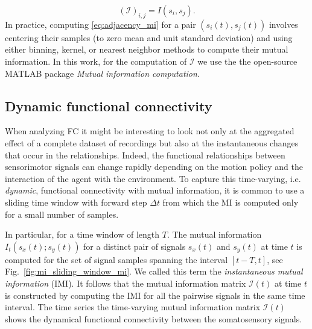 \begin{equation}\label{eq:adjacency_mi}
	(\bm{\mathcal{I}})_{i,j} = I(s_i,s_j).
\end{equation}
In practice, computing \eqref{eq:adjacency_mi}  for a pair $\left({s}_i(t),{s}_j(t)\right)$ involves centering their samples (to zero mean and unit standard deviation) and using either binning, kernel, or nearest neighbor methods \cite{WaltersWilliams2009Estimationmutualinformation} to compute their mutual information. In this work, for the computation of $\bm{\mathcal{I}}$ we use the the open-source MATLAB package \emph{Mutual information computation}\cite{PengMutualInformationcomputation}.

\subsection{Dynamic functional connectivity}
When analyzing FC it might be interesting to look not only at the aggregated effect of a complete dataset of recordings but also at the instantaneous changes that occur in the relationships. Indeed, the functional relationships between sensorimotor signals can change rapidly depending on the motion policy and the interaction of the agent with the environment. To capture this time-varying, i.e. \emph{dynamic}, functional connectivity with mutual information, it is common to use a sliding time window \cite{Preti2017dynamicfunctionalconnectome} with forward step $\Delta t$ from which the MI is computed only for a small number of samples.

In particular, for a time window of length $T$. The mutual information $I_t(s_x(t);s_y(t))$ for a distinct pair of signals $s_x(t)$ and $s_y(t)$ at time $t$ is computed for the set of signal samples spanning the interval $\left[t-T,t\right]$, see Fig.~\ref{fig:mi_sliding_window_mi}. We called this term the \emph{instantaneous mutual information} (IMI). It follows that the mutual information matrix $\bm{\mathcal{I}}(t)$ at time $t$ is constructed by computing the IMI for all the pairwise signals in the same time interval. The time series the time-varying mutual information matrix $\bm{\mathcal{I}}(t)$ shows the dynamical functional connectivity between the somatosensory signals.


